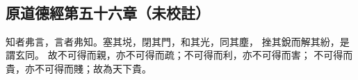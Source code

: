 ﻿%
%

\chapter{~}

\section{原道德經第五十六章（未校註）}

\begin{withgezhu}

\zhsong


知者弗言，言者弗知。塞其㙂，閉其門，和其光，同其塵，
\textcolor{tongjia-color}{挫其銳而解其紛}，是謂玄同。
故不可得而親，亦不可得而疏；不可得而利，亦不可得而害；
不可得而貴，亦不可得而賤；故為天下貴。

\end{withgezhu}
